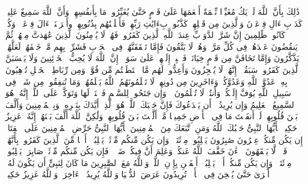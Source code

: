 \stopbuffer%
\startbuffer[\q:8:53]
ذَٰلِكَ بِأَنَّ ٱللَّهَ لَمۡ یَكُ مُغَیِّرࣰا نِّعۡمَةً أَنۡعَمَهَا عَلَىٰ قَوۡمٍ حَتَّىٰ یُغَیِّرُوا۟ مَا بِأَنفُسِهِمۡ وَأَنَّ ٱللَّهَ سَمِیعٌ عَلِیمࣱ%
\stopbuffer%
\startbuffer[\q:8:54]
كَدَأۡبِ ءَالِ فِرۡعَوۡنَ وَٱلَّذِینَ مِن قَبۡلِهِمۡۚ كَذَّبُوا۟ بِءَایَٰتِ رَبِّهِمۡ فَأَهۡلَكۡنَٰهُم بِذُنُوبِهِمۡ وأَغۡرَقۡنَاۤ ءَالَ فِرۡعَوۡنَۚ وَكُلࣱّ كَانُوا۟ ظَٰلِمِینَ%
\stopbuffer%
\startbuffer[\q:8:55]
إِنَّ شَرَّ ٱلدَّوَاۤبِّ عِندَ ٱللَّهِ ٱلَّذِینَ كَفَرُوا۟ فَهُمۡ لَا یُؤۡمِنُونَ%
\stopbuffer%
\startbuffer[\q:8:56]
ٱلَّذِینَ عَٰهَدتَّ مِنۡهُمۡ ثُمَّ یَنقُضُونَ عَهۡدَهُمۡ فِی كُلِّ مَرَّةࣲ وَهُمۡ لَا یَتَّقُونَ%
\stopbuffer%
\startbuffer[\q:8:57]
فَإِمَّا تَثۡقَفَنَّهُمۡ فِی ٱلۡحَرۡبِ فَشَرِّدۡ بِهِم مَّنۡ خَلۡفَهُمۡ لَعَلَّهُمۡ یَذَّكَّرُونَ%
\stopbuffer%
\startbuffer[\q:8:58]
وَإِمَّا تَخَافَنَّ مِن قَوۡمٍ خِیَانَةࣰ فَٱنۢبِذۡ إِلَیۡهِمۡ عَلَىٰ سَوَاۤءٍۚ إِنَّ ٱللَّهَ لَا یُحِبُّ ٱلۡخَاۤئِنِینَ%
\stopbuffer%
\startbuffer[\q:8:59]
وَلَا یَحۡسَبَنَّ ٱلَّذِینَ كَفَرُوا۟ سَبَقُوۤا۟ۚ إِنَّهُمۡ لَا یُعۡجِزُونَ%
\stopbuffer%
\startbuffer[\q:8:60]
وَأَعِدُّوا۟ لَهُم مَّا ٱسۡتَطَعۡتُم مِّن قُوَّةࣲ وَمِن رِّبَاطِ ٱلۡخَیۡلِ تُرۡهِبُونَ بِهِۦ عَدُوَّ ٱللَّهِ وَعَدُوَّكُمۡ وَءَاخَرِینَ مِن دُونِهِمۡ لَا تَعۡلَمُونَهُمُ ٱللَّهُ یَعۡلَمُهُمۡۚ وَمَا تُنفِقُوا۟ مِن شَیۡءࣲ فِی سَبِیلِ ٱللَّهِ یُوَفَّ إِلَیۡكُمۡ وَأَنتُمۡ لَا تُظۡلَمُونَ%
\stopbuffer%
\startbuffer[\q:8:61]
۞ وَإِن جَنَحُوا۟ لِلسَّلۡمِ فَٱجۡنَحۡ لَهَا وَتَوَكَّلۡ عَلَى ٱللَّهِۚ إِنَّهُۥ هُوَ ٱلسَّمِیعُ ٱلۡعَلِیمُ%
\stopbuffer%
\startbuffer[\q:8:62]
وَإِن یُرِیدُوۤا۟ أَن یَخۡدَعُوكَ فَإِنَّ حَسۡبَكَ ٱللَّهُۚ هُوَ ٱلَّذِیۤ أَیَّدَكَ بِنَصۡرِهِۦ وَبِٱلۡمُؤۡمِنِینَ%
\stopbuffer%
\startbuffer[\q:8:63]
وَأَلَّفَ بَیۡنَ قُلُوبِهِمۡۚ لَوۡ أَنفَقۡتَ مَا فِی ٱلۡأَرۡضِ جَمِیعࣰا مَّاۤ أَلَّفۡتَ بَیۡنَ قُلُوبِهِمۡ وَلَٰكِنَّ ٱللَّهَ أَلَّفَ بَیۡنَهُمۡۚ إِنَّهُۥ عَزِیزٌ حَكِیمࣱ%
\stopbuffer%
\startbuffer[\q:8:64]
یَٰۤأَیُّهَا ٱلنَّبِیُّ حَسۡبُكَ ٱللَّهُ وَمَنِ ٱتَّبَعَكَ مِنَ ٱلۡمُؤۡمِنِینَ%
\stopbuffer%
\startbuffer[\q:8:65]
یَٰۤأَیُّهَا ٱلنَّبِیُّ حَرِّضِ ٱلۡمُؤۡمِنِینَ عَلَى ٱلۡقِتَالِۚ إِن یَكُن مِّنكُمۡ عِشۡرُونَ صَٰبِرُونَ یَغۡلِبُوا۟ مِا۟ئَتَیۡنِۚ وَإِن یَكُن مِّنكُم مِّا۟ئَةࣱ یَغۡلِبُوۤا۟ أَلۡفࣰا مِّنَ ٱلَّذِینَ كَفَرُوا۟ بِأَنَّهُمۡ قَوۡمࣱ لَّا یَفۡقَهُونَ%
\stopbuffer%
\startbuffer[\q:8:66]
ٱلۡءَٰنَ خَفَّفَ ٱللَّهُ عَنكُمۡ وَعَلِمَ أَنَّ فِیكُمۡ ضَعۡفࣰاۚ فَإِن یَكُن مِّنكُم مِّا۟ئَةࣱ صَابِرَةࣱ یَغۡلِبُوا۟ مِا۟ئَتَیۡنِۚ وَإِن یَكُن مِّنكُمۡ أَلۡفࣱ یَغۡلِبُوۤا۟ أَلۡفَیۡنِ بِإِذۡنِ ٱللَّهِۗ وَٱللَّهُ مَعَ ٱلصَّٰبِرِینَ%
\stopbuffer%
\startbuffer[\q:8:67]
مَا كَانَ لِنَبِیٍّ أَن یَكُونَ لَهُۥۤ أَسۡرَىٰ حَتَّىٰ یُثۡخِنَ فِی ٱلۡأَرۡضِۚ تُرِیدُونَ عَرَضَ ٱلدُّنۡیَا وَٱللَّهُ یُرِیدُ ٱلۡءَاخِرَةَۗ وَٱللَّهُ عَزِیزٌ حَكِیمࣱ%
